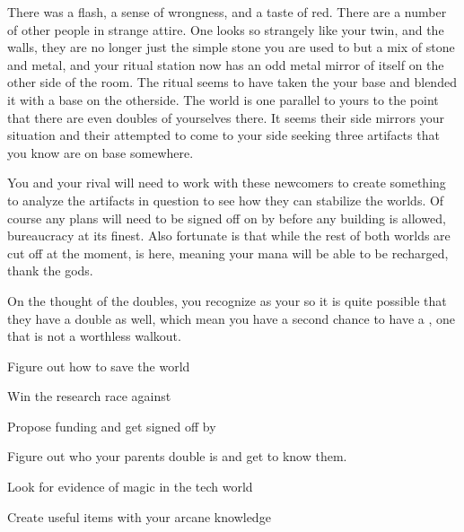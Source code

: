 \documentclass[char]{guildcamp3}
\begin{document}
There was a flash, a sense of wrongness, and a taste of red. There are a number of other people in strange attire. One looks so strangely like your twin, and the walls, they are no longer just the simple stone you are used to but a mix of stone and metal, and your ritual station now has an odd metal mirror of itself on the other side of the room. The ritual seems to have taken the your base and blended it with a base on the otherside. The world is one parallel to yours to the point that there are even doubles of yourselves there. It seems their side mirrors your situation and their attempted to come to your side seeking three artifacts that you know are on base somewhere. 

You and your rival will need to work with these newcomers to create something to analyze the artifacts in question to see how they can stabilize the worlds. Of course any plans will need to be signed off on by \cNobleTwo{} before any building is allowed, bureaucracy at its finest. Also fortunate is that while the rest of both worlds are cut off at the moment, \cPaladin{} is here, meaning your mana will be able to be recharged, thank the gods.

On the thought of the doubles, you recognize \cRogueTwo{\intro} as your \cRogueTwo{\parent} so it is quite possible that they have a double as well, which mean you have a second chance to have a \cRogueTwo{\parent}, one that is not a worthless walkout. 





\begin{itemz}[Goals]
  \item Figure out how to save the world
  \item Win the research race against \cMageTwo{}
  \item Propose funding and get signed off by \cNobleTwo{}
  \item Figure out who your parents double is and get to know them.
  \item Look for evidence of magic in the tech world
  \item Create useful items with your arcane knowledge
\end{itemz}
\end{document}
